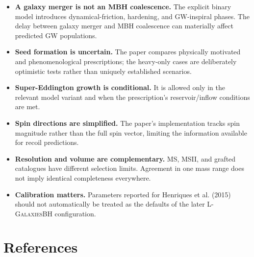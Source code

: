 \documentclass[11pt,a4paper]{article}
\newcommand{\Lgalbh}{\textsc{L-GalaxiesBH}}
\begin{document}
\begin{itemize}
  \item \textbf{A galaxy merger is not an MBH coalescence.} The explicit binary model introduces dynamical-friction, hardening, and GW-inspiral phases. The delay between galaxy merger and MBH coalescence can materially affect predicted GW populations.
  \item \textbf{Seed formation is uncertain.} The paper compares physically motivated and phenomenological prescriptions; the heavy-only cases are deliberately optimistic tests rather than uniquely established scenarios.
  \item \textbf{Super-Eddington growth is conditional.} It is allowed only in the relevant model variant and when the prescription's reservoir/inflow conditions are met.
  \item \textbf{Spin directions are simplified.} The paper's implementation tracks spin magnitude rather than the full spin vector, limiting the information available for recoil predictions.
  \item \textbf{Resolution and volume are complementary.} MS, MSII, and grafted catalogues have different selection limits. Agreement in one mass range does not imply identical completeness everywhere.
  \item \textbf{Calibration matters.} Parameters reported for Henriques et al. (2015) should not automatically be treated as the defaults of the later \Lgalbh{} configuration.
\end{itemize}

\section{References}
\end{document}
